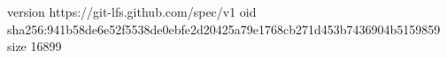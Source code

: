 version https://git-lfs.github.com/spec/v1
oid sha256:941b58de6e52f5538de0ebfe2d20425a79e1768cb271d453b7436904b5159859
size 16899
